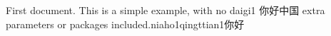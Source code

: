 \documentclass{article}
\begin{document}
First document. This is a simple example, with no daigi1
 你好中国
extra parameters or packages included.niaho1qingttian1你好
\end{document}
